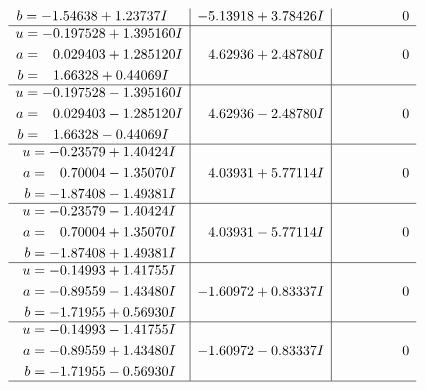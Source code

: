 \documentclass[1p]{elsarticle_modified}
\theoremstyle{definition}
\begin{document}
$$\begin{array}{c|c|c}
\begin{aligned}
b &= -1.54638 + 1.23737 I\end{aligned}
 & -5.13918 + 3.78426 I & \phantom{-0.000000 } 0 \\ \hline\begin{aligned}
u &= -0.197528 + 1.395160 I \\
a &= \phantom{-}0.029403 + 1.285120 I \\
b &= \phantom{-}1.66328 + 0.44069 I\end{aligned}
 & \phantom{-}4.62936 + 2.48780 I & \phantom{-0.000000 } 0 \\ \hline\begin{aligned}
u &= -0.197528 - 1.395160 I \\
a &= \phantom{-}0.029403 - 1.285120 I \\
b &= \phantom{-}1.66328 - 0.44069 I\end{aligned}
 & \phantom{-}4.62936 - 2.48780 I & \phantom{-0.000000 } 0 \\ \hline\begin{aligned}
u &= -0.23579 + 1.40424 I \\
a &= \phantom{-}0.70004 - 1.35070 I \\
b &= -1.87408 - 1.49381 I\end{aligned}
 & \phantom{-}4.03931 + 5.77114 I & \phantom{-0.000000 } 0 \\ \hline\begin{aligned}
u &= -0.23579 - 1.40424 I \\
a &= \phantom{-}0.70004 + 1.35070 I \\
b &= -1.87408 + 1.49381 I\end{aligned}
 & \phantom{-}4.03931 - 5.77114 I & \phantom{-0.000000 } 0 \\ \hline\begin{aligned}
u &= -0.14993 + 1.41755 I \\
a &= -0.89559 - 1.43480 I \\
b &= -1.71955 + 0.56930 I\end{aligned}
 & -1.60972 + 0.83337 I & \phantom{-0.000000 } 0 \\ \hline\begin{aligned}
u &= -0.14993 - 1.41755 I \\
a &= -0.89559 + 1.43480 I \\
b &= -1.71955 - 0.56930 I\end{aligned}
 & -1.60972 - 0.83337 I & \phantom{-0.000000 } 0\\
 \hline 
 \end{array}$$\newpage$$\begin{array}{c|c|c}  

\end{array}$$
\end{document}
